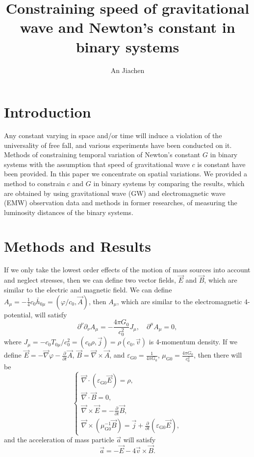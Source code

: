 \documentclass{article}
\title{Constraining speed of gravitational wave and Newton's constant in binary systems}
\author{An Jiachen}
\def\p{\partial}
\begin{document}
\maketitle

\section{Introduction}

Any constant varying in space and/or time will induce a violation of the universality of free fall, and various experiments have been conducted on it. Methods of constraining temporal variation of Newton's constant $G$ in binary systems with the assumption that speed of gravitational wave $c$ is constant have been provided. In this paper we concentrate on spatial variations. We provided a method to constrain $c$ and $G$ in binary systems by comparing the results, which are obtained by using gravitational wave (GW) and electromagnetic wave (EMW) observation data and methods in former researches, of measuring the luminosity distances of the binary systems.

\section{Methods and Results}

If we only take the lowest order effects of the motion of mass sources into account and neglect stresses, then we can define two vector fields, $\vec{E}$ and $\vec{B}$, which are similar to the electric and magnetic field. We can define $A_\mu=-\frac{1}{4}c_0\bar{h}_{0 \mu}=(\varphi/c_0,\vec{A})$, then $A_\mu$, which are similar to the electromagnetic 4-potential, will satisfy
\begin{equation}
    \p^\nu\p_\nu A_\mu=-\frac{4\pi G_0}{c_0^2}J_\mu,\quad\p^\mu A_\mu=0,
\end{equation}
where $J_\mu=-c_0T_{0 \mu}/c_0^2=(c_0\rho,\vec{j})=\rho(c_0,\vec{v})$ is 4-momentum density. If we define $\vec{E}=-\vec{\nabla}\varphi-\frac{\p}{\p t}\vec{A}$, $\vec{B}=\vec{\nabla}\times\vec{A}$, and $\varepsilon_{\text{G}0}=\frac{1}{4\pi G_0}$, $\mu_{\text{G}0}=\frac{4\pi G_0}{c_0^2}$, then there will be
\begin{equation}\label{maxwell_0}
    \begin{cases}
        \vec{\nabla}\cdot(\varepsilon_{\text{G}0}\vec{E})=\rho,\\
        \vec{\nabla}\cdot\vec{B}=0,\\
        \vec{\nabla}\times\vec{E}=-\frac{\p}{\p t}\vec{B},\\
        \vec{\nabla}\times(\mu_{\text{G}0}^{-1}\vec{B})=\vec{j}+\frac{\p}{\p t}(\varepsilon_{\text{G}0}\vec{E}),
    \end{cases}
\end{equation}
and the acceleration of mass particle $\vec{a}$ will satisfy
\begin{equation}\label{lorentz}
    \vec{a}=-\vec{E}-4\vec{v}\times\vec{B}.
\end{equation}
\end{document}
